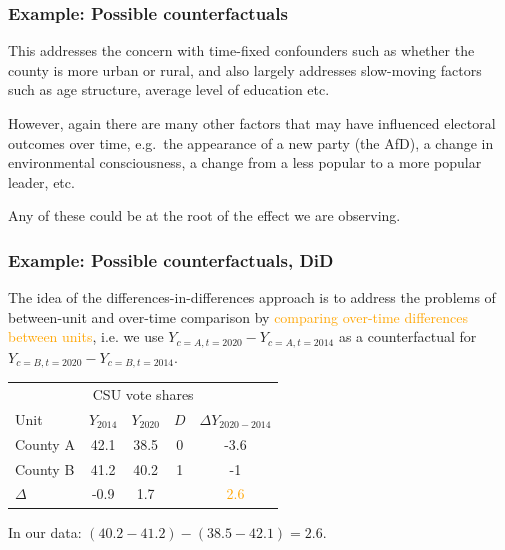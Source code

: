 \documentclass[12pt,english,dvipsnames,aspectratio=169,handout]{beamer}\usepackage[]{graphicx}\usepackage[]{xcolor}
\begin{document}
\begin{frame}
  \frametitle{Example: Possible counterfactuals}
\footnotesize

This addresses the concern with time-fixed confounders such as whether the county is more urban or rural, and also largely addresses slow-moving factors such as age structure, average level of education etc.

However, again there are many other factors that may have influenced electoral outcomes over time, e.g.\ the appearance of a new party (the AfD), a change in environmental consciousness, a change from a less popular to a more popular leader, etc.

Any of these could be at the root of the effect we are observing.

\vspace{1cm}
  
\end{frame}




\begin{frame}
  \frametitle{Example: Possible counterfactuals, DiD}
\footnotesize

The idea of the differences-in-differences approach is to address the problems of between-unit and over-time comparison by \textcolor{orange}{comparing over-time differences between units}, i.e. we use $Y_{c=A,t=2020} - Y_{c=A,t=2014}$ as a counterfactual for  $Y_{c=B,t=2020} - Y_{c=B,t=2014}$.

\scriptsize
\begin{table}\centering
\begin{tabular}{lcccc}
\toprule
\multicolumn{5}{c}{CSU vote shares } \\
Unit    & $Y_{2014}$  & $Y_{2020}$  & $D$ & $\Delta Y_{2020-2014}$  \\
\midrule
County A &  42.1     &    38.5   & 0  &   -3.6     \\
County B &  41.2     &    40.2   & 1  &     -1  \\
\midrule \midrule
$\Delta$     &  -0.9     &     1.7   &    & \textcolor{orange}{2.6} \\
\bottomrule
\end{tabular}
\end{table}

\footnotesize
In our data: $(40.2-41.2)-(38.5-42.1)=2.6$.
\end{frame}
\end{document}
